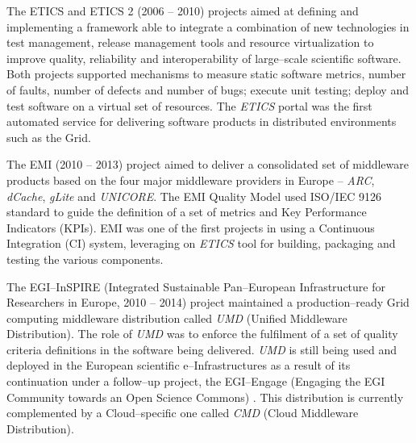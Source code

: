\documentclass[journal]{IEEEtran}
\begin{document}
The ETICS and ETICS 2 (2006 -- 2010) \cite{cordis:etics} projects aimed at defining and implementing a framework able to integrate a combination of new technologies in test management, release management tools and resource virtualization to improve quality, reliability and interoperability of large--scale scientific software. Both projects supported mechanisms to measure static software metrics, number of faults, number of defects and number of bugs; execute unit testing; deploy and test software on a virtual set of resources. The {\sl ETICS} portal was the first automated service for delivering software products in distributed environments such as the Grid.

The EMI (2010 -- 2013) project \cite{cordis:emi} aimed to deliver a consolidated set of middleware products based on the four major middleware providers in Europe -- {\sl ARC}, {\sl dCache}, {\sl gLite} and {\sl UNICORE}. The EMI Quality Model used ISO/IEC 9126 standard \cite{iso9126} to guide the definition of a set of metrics and Key Performance Indicators (KPIs). EMI was one of the first projects in using a Continuous Integration (CI) system, leveraging on {\sl ETICS} tool  for building, packaging and testing the various components.

The EGI--InSPIRE (Integrated Sustainable Pan--European Infrastructure for Researchers in Europe, 2010 -- 2014) project \cite{cordis:egi-inspire} maintained a production--ready Grid computing middleware distribution called {\sl UMD} (Unified Middleware Distribution). The role of {\sl UMD} was to enforce the fulfilment of a set of quality criteria definitions \cite{egi-qc} in the software being delivered. {\sl UMD} is still being used and deployed in the European scientific e--Infrastructures as a result of its continuation under a follow--up project, the EGI--Engage (Engaging the EGI Community towards an Open Science Commons) \cite{cordis:egi-engage}. This distribution is currently complemented by a Cloud--specific one called {\sl CMD} (Cloud Middleware Distribution).

\end{document}
